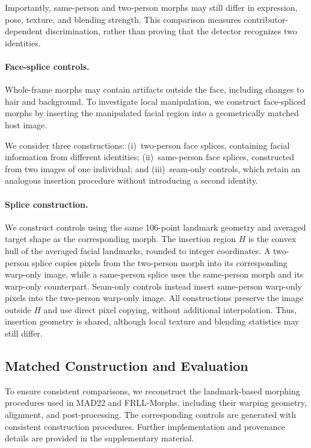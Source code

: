 Importantly, same-person and two-person morphs may still
differ in expression, pose, texture, and blending strength.
This comparison measures contributor-dependent
discrimination, rather than proving that the detector
recognizes two identities.

\paragraph{Face-splice controls.}
Whole-frame morphs may contain artifacts outside the face,
including changes to hair and background. To investigate
local manipulation, we construct face-spliced morphs by
inserting the manipulated facial region into a geometrically
matched host image.

We consider three constructions:
(i)~two-person face splices, containing facial information
from different identities;
(ii)~same-person face splices, constructed from two images
of one individual; and
(iii)~seam-only controls, which retain an analogous
insertion procedure without introducing a second identity.


\paragraph{Splice construction.}
We construct controls using the same 106-point landmark
geometry and averaged target shape as the corresponding
morph. The insertion region $H$ is the convex hull of
the averaged facial landmarks, rounded to integer
coordinates. A two-person splice copies pixels from
the two-person morph into its corresponding warp-only
image, while a same-person splice uses the same-person
morph and its warp-only counterpart. Seam-only controls
instead insert same-person warp-only pixels into the
two-person warp-only image. All constructions preserve
the image outside $H$ and use direct pixel copying,
without additional interpolation. Thus, insertion
geometry is shared, although local texture and blending
statistics may still differ.


\subsection{Matched Construction and Evaluation}
\label{sec:control_protocol}

To ensure consistent comparisons, we reconstruct the
landmark-based morphing procedures used in MAD22 and
FRLL-Morphs, including their warping geometry, alignment,
and post-processing. The corresponding controls are
generated with consistent construction procedures.
Further implementation and provenance details are
provided in the supplementary material.

